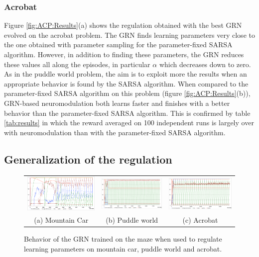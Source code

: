 \subsubsection{Acrobat}

Figure \ref{fig:ACP:Results}(a) shows the regulation obtained with the best GRN evolved on the acrobat problem. The GRN finds learning parameters very close to the one obtained with parameter sampling for the parameter-fixed SARSA algorithm. However, in addition to finding these parameters, the GRN reduces these values all along the episodes, in particular $\alpha$ which decreases down to zero. As in the puddle world problem, the aim is to exploit more the results when an appropriate behavior is found by the SARSA algorithm. When compared to the parameter-fixed SARSA algorithm on this problem (figure \ref{fig:ACP:Results}(b)), GRN-based neuromodulation both learns faster and finishes with a better behavior than the parameter-fixed SARSA algorithm. This is confirmed by table \ref{tab:results} in which the reward averaged on 100 independent runs is largely over with neuromodulation than with the parameter-fixed SARSA algorithm. 

\subsection{Generalization of the regulation}

\begin{figure}[t!]
\center
\begin{tabular}{ccc}
\includegraphics[width=0.32\linewidth]{MC_GRNMazeBehavior.pdf} &
\includegraphics[width=0.32\linewidth]{PW_GRNMazeBehavior.pdf} &
\includegraphics[width=0.32\linewidth]{ACP_GRNMazeBehavior.pdf} \\
(a) Mountain Car & (b) Puddle world & (c) Acrobat
\end{tabular}
\caption{Behavior of the GRN trained on the maze when used to regulate learning parameters on mountain car, puddle world and acrobat.}\label{fig:all:GRNMazeBehavior}
\end{figure}

